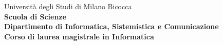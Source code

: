 \begin{titlepage}
  \center %


  \begingroup
  \noindent
  \begin{minipage}[t]{0.16\textwidth}
  \end{minipage}%
  \hfill
  \begin{minipage}[t]{0.8\textwidth}\raggedright
    {\large Università degli Studi di Milano Bicocca} \\
    \textbf{Scuola di Scienze} \\
    \textbf{Dipartimento di Informatica, Sistemistica e Comunicazione} \\
    \textbf{Corso di laurea magistrale in Informatica} \\
  \end{minipage}%
  \par\endgroup



\end{titlepage}
